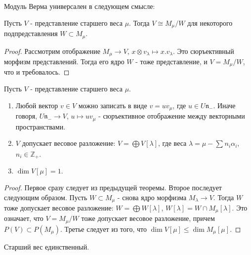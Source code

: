 \documentclass[a4article]{article}
\begin{document}
Модуль Верма универсален в следующем смысле:
\begin{lemma}
    Пусть $V$ - представление старшего веса $\mu$. Тогда $V \cong M_{\mu}/W$ для некоторого подпредставления $W \subset M_{\mu}$.
\end{lemma}
\begin{proof}
    Рассмотрим отображение $M_{\mu} \rightarrow V$, $x\otimes v_{\lambda} \mapsto x.v_{\lambda}$. Это сюръективный морфизм представлений. Тогда его ядро $W$ - тоже представление, и $V = M_{\mu}/W$, что и требовалось.
\end{proof}

\begin{corollary}
    Пусть $V$ - представление старшего веса $\mu$.
    \begin{enumerate}
        \item Любой вектор $v \in V$ можно записать в виде $v = uv_{\mu}$, где $u \in U\mathfrak{n}_-$. Иначе говоря, $U\mathfrak{n}_- \rightarrow V$, $u \mapsto uv_{\mu}$ - сюръективное отображение между векторными пространствами.
        \item $V$ допускает весовое разложение: $V=\bigoplus V[\lambda]$, где веса $\lambda = \mu - \sum_{}n_i\alpha_i$, $n_i \in \mathbb{Z}_+$.
        \item $\dim V[\mu]=1$.
    \end{enumerate}
\end{corollary}
\begin{proof}
    Первое сразу следует из предыдущей теоремы. Второе последует следующим образом. Пусть $W \subset M_{\mu}$ - снова ядро морфизма $M_{\lambda} \rightarrow V$. Тогда $W$ тоже допускает весовое разложение: $W = \bigoplus W[\lambda]$, $W[\lambda] = W \cap M_{\mu}[\lambda]$. Это означает, что $V=M_{\mu}/W$ тоже допускает весовое разложение, причем $P(V) \subset P(M_{\mu})$. Третье следует из того, что $\dim V[\mu] \le \dim M_{\mu}[\mu]$.
\end{proof}
\begin{corollary}
    Старший вес единственный.
\end{corollary}
\end{document}
